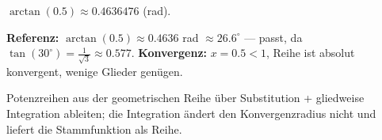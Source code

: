 \begin{ergebnis}
$\arctan(0.5)\approx0.4636476$ (rad).
\end{ergebnis}

\begin{kontrolle}
\textbf{Referenz:} $\arctan(0.5)\approx0.4636$ rad $\approx26.6^\circ$ — passt,
da $\tan(30^\circ)=\frac1{\sqrt3}\approx0.577$. \textbf{Konvergenz:} $x=0.5<1$,
Reihe ist absolut konvergent, wenige Glieder genügen.
\end{kontrolle}

\begin{merksatz}
Potenzreihen aus der geometrischen Reihe über Substitution + gliedweise
Integration ableiten; die Integration ändert den Konvergenzradius nicht und
liefert die Stammfunktion als Reihe.
\end{merksatz}
